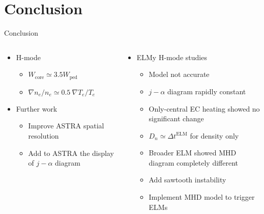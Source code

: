 \section{Conclusion}
\begin{frame}
\vspace{-2mm}
\begin{center}
\hspace{-15mm}
Conclusion
\end{center}
\vspace{-8mm}
\begin{columns}[t]
\hspace{-1cm}
\begin{column}{0.46\textwidth}
	\begin{itemize}
		\item<1-> H-mode
		\begin{itemize}
			\item<2-> $W_{\textrm{core}} \simeq 3.5 W_{\textrm{ped}}$\\ \uncover<3->{\smiley}
			\item<4-> $\nabla n_e / n_e \simeq 0.5\ \nabla T_e / T_e$\\ \uncover<5->{\smiley}
		\end{itemize}
		\vspace{7mm}
		\item<12-> Further work
		\begin{itemize}
			\item<13-> Improve ASTRA spatial resolution
			\item<14-> Add to ASTRA the display of $j - \alpha$ diagram
		\end{itemize}
	\end{itemize}
\end{column}
\hspace{-2cm}
\begin{column}{0.58\textwidth}
	\begin{itemize}
		\item<6-> ELMy H-mode studies
		\begin{itemize}
			\item<7-> Model not accurate \frownie
			\item<8-> $j - \alpha$ diagram rapidly constant
			\item<9-> Only-central EC heating showed no significant change
			\item<10-> $D_n \simeq \Delta t^{\textrm{ELM}}$ for density only
			\item<11-> Broader ELM showed MHD diagram completely different
		\end{itemize}
		\vspace{8mm}
		\begin{itemize}
			\item<15-> Add sawtooth instability
			\item<16-> Implement MHD model to trigger ELMs
		\end{itemize}
	\end{itemize}
\end{column}
\end{columns}
\end{frame}
